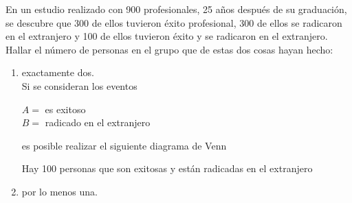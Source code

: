 \item En un estudio realizado con 900 profesionales, 25 años después de su graduación, se descubre que 300 de ellos tuvieron éxito profesional, 300 de ellos se radicaron en el extranjero y 100 de ellos tuvieron éxito y se radicaron en el extranjero. Hallar el número de personas en el grupo que de estas dos cosas hayan hecho:
    \begin{enumerate}
        \item exactamente dos.\e\\
            Si se consideran los eventos
            \begin{center}
                $A=$ es exitoso\\
                $B=$ radicado en el extranjero 
            \end{center}
            es posible realizar el siguiente diagrama de Venn
            \begin{center}
            \end{center}
            Hay 100 personas que son exitosas y están radicadas en el extranjero
        \item por lo menos una.
            \begin{center}
\end{center}
\end{enumerate}
